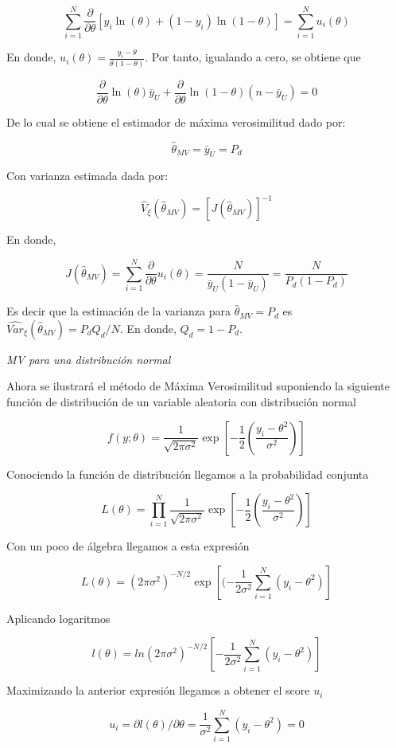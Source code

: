 \documentclass[
  12pt,
]{book}
\begin{document}
\[
\sum_{i=1}^{N}\frac{\partial}{\partial\theta}\left[{y_{i}}\ln(\theta)+(1-y_{i})\ln(1-\theta)\right]=\sum_{i=1}^{N}u_{i}(\theta)
\]

En donde, \(u_{i}(\theta)=\frac{y_{i}-\theta}{\theta(1-\theta)}\). Por tanto, igualando a cero, se obtiene que

\[
\frac{\partial}{\partial\theta}\ln(\theta)\bar{y}_{U}+\frac{\partial}{\partial\theta}\ln(1-\theta)(n-\bar{y}_{U})=0
\]

De lo cual se obtiene el estimador de máxima verosimilitud dado por:

\[
\hat{\theta}_{MV}=\bar{y}_{U}=P_{d}
\]

Con varianza estimada dada por:

\[
\hat{V}_{\xi}(\hat{\theta}_{MV})=[J(\hat{\theta}_{MV})]^{-1}
\]

En donde,

\[
J(\hat{\theta}_{MV})=\sum_{i=1}^{N}\frac{\partial}{\partial\theta}u_{i}(\theta)=\frac{N}{\bar{y}_{U}(1-\bar{y}_{U})}=\frac{N}{P_{d}(1-P_{d})}
\]

Es decir que la estimación de la varianza para \(\hat{\theta}_{MV}=P_{d}\)
es \(\hat{Var}_{\xi}(\hat{\theta}_{MV})=P_{d}Q_{d}/N\). En donde, \(Q_{d}=1-P_{d}\).

\emph{MV para una distribución normal}

Ahora se ilustrará el método de Máxima Verosimilitud suponiendo la siguiente función de distribución de un variable aleatoria con distribución normal

\[
f(y;\theta)=\dfrac{1}{\sqrt{2\pi\sigma^{2}}}\exp\left[-\dfrac{1}{2}\left(\dfrac{y_{i}-\theta^{2}}{\sigma^{2}}\right)\right]
\]

Conociendo la función de distribución llegamos a la probabilidad conjunta

\[
L(\theta)=\prod_{i=1}^{N}\dfrac{1}{\sqrt{2\pi\sigma^{2}}}\exp\left[-\dfrac{1}{2}\left(\dfrac{y_{i}-\theta^{2}}{\sigma^{2}}\right)\right]
\]

Con un poco de álgebra llegamos a esta expresión

\[
L(\theta)=(2\pi\sigma^{2})^{-N/2}\exp[(-\dfrac{1}{2\sigma^{2}}\sum_{i=1}^{N}(y_{i}-\theta^{2})]
\]

Aplicando logaritmos

\[
l(\theta)=ln(2\pi\sigma^{2})^{-N/2}[-\dfrac{1}{2\sigma^{2}}\sum_{i=1}^{N}(y_{i}-\theta^{2})]
\]

Maximizando la anterior expresión llegamos a obtener el score \(u_{i}\)

\[
u_{i}=\partial l(\theta)/\partial\theta=\dfrac{1}{\sigma^{2}}\sum_{i=1}^{N}(y_{i}-\theta^{2})=0
\]
\end{document}
